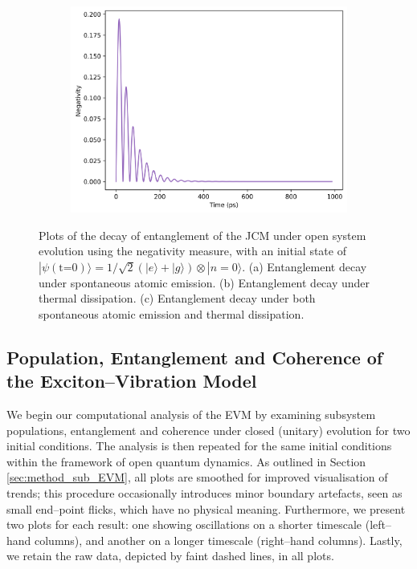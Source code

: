 \documentclass[11pt]{article}
\begin{document}
\begin{figure}[H]
    \begin{subfigure}{0.45\textwidth}
        \centering
        \includegraphics[width=0.85\linewidth]{Research Project/Code/results/JCM/OQS_Neg_Both_eg.png}
        \caption{}
        \label{fig:jcm_cqs_coh_eg}
    \end{subfigure}
    \hfill
    \caption{Plots of the decay of entanglement of the JCM under open system evolution using the negativity measure, with an initial state of $|\psi (\text{t=0})\rangle = 1/\sqrt{2}(|e\rangle + |g\rangle)\otimes|n=0\rangle$. (a) Entanglement decay under spontaneous atomic emission. (b) Entanglement decay under thermal dissipation. (c) Entanglement decay under both spontaneous atomic emission and thermal dissipation.}
    \label{fig:JCM_OQS_Neg_eg}
\end{figure}

\subsection{Population, Entanglement and Coherence of the Exciton--Vibration Model}

We begin our computational analysis of the EVM by examining subsystem populations, entanglement and coherence under closed (unitary) evolution for two initial conditions. The analysis is then repeated for the same initial conditions within the framework of open quantum dynamics. As outlined in Section \ref{sec:method_sub_EVM}, all plots are smoothed for improved visualisation of trends; this procedure occasionally introduces minor boundary artefacts, seen as small end--point flicks, which have no physical meaning. Furthermore, we present two plots for each result: one showing oscillations on a shorter timescale (left--hand columns), and another on a longer timescale (right--hand columns). Lastly, we retain the raw data, depicted by faint dashed lines, in all plots. 
\end{document}
